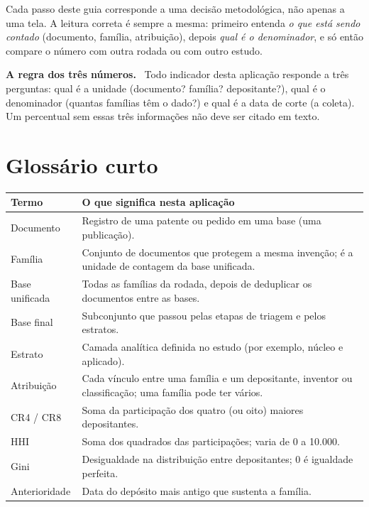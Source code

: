 \documentclass[11pt,a4paper]{article}
\renewenvironment{leftbar}{%
  \def\FrameCommand{{\color{accent}\vrule width 2.6pt}\hspace{10pt}}%
  \MakeFramed{\advance\hsize-\width\FrameRestore}}%
 {\endMakeFramed}
\newenvironment{nota}[1][Nota]%
 {\begin{leftbar}\small\color{ink2}\textbf{\textsf{\color{accent}#1.}}\ }%
 {\end{leftbar}}
\begin{document}
Cada passo deste guia corresponde a uma decisão metodológica, não apenas a uma tela. A leitura correta
é sempre a mesma: primeiro entenda \emph{o que está sendo contado} (documento, família, atribuição),
depois \emph{qual é o denominador}, e só então compare o número com outra rodada ou com outro estudo.

\begin{nota}[A regra dos três números]
Todo indicador desta aplicação responde a três perguntas: qual é a unidade (documento? família?
depositante?), qual é o denominador (quantas famílias têm o dado?) e qual é a data de corte (a coleta).
Um percentual sem essas três informações não deve ser citado em texto.
\end{nota}

\tableofcontents
\clearpage












\section{Glossário curto}
\label{sec:glossario}

\begin{tabularx}{\linewidth}{@{}p{4.1cm}L@{}}
\toprule
\textbf{Termo} & \textbf{O que significa nesta aplicação} \\
\midrule
Documento & Registro de uma patente ou pedido em uma base (uma publicação). \\
Família & Conjunto de documentos que protegem a mesma invenção; é a unidade de contagem da base unificada. \\
Base unificada & Todas as famílias da rodada, depois de deduplicar os documentos entre as bases. \\
Base final & Subconjunto que passou pelas etapas de triagem e pelos estratos. \\
Estrato & Camada analítica definida no estudo (por exemplo, núcleo e aplicado). \\
Atribuição & Cada vínculo entre uma família e um depositante, inventor ou classificação; uma família pode ter vários. \\
CR4 / CR8 & Soma da participação dos quatro (ou oito) maiores depositantes. \\
HHI & Soma dos quadrados das participações; varia de 0 a 10.000. \\
Gini & Desigualdade na distribuição entre depositantes; 0 é igualdade perfeita. \\
Anterioridade & Data do depósito mais antigo que sustenta a família. \\
\bottomrule
\end{tabularx}
\end{document}

